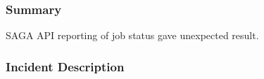 







\subsubsection{Summary}
SAGA API reporting of job status gave unexpected result.

\subsubsection{Incident Description}

